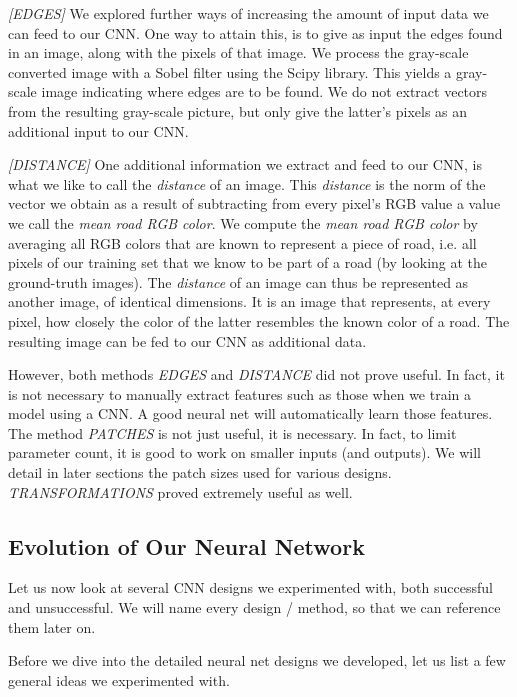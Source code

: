 \documentclass[10pt,conference,compsocconf]{IEEEtran}
\begin{document}
\textit{[EDGES]}   
We explored further ways of increasing the amount of input data we can feed to our CNN. One way to attain this, is to give as input the edges found in an image, along with the pixels of that image. We process the gray-scale converted image with a Sobel filter using the Scipy library. This yields a gray-scale image indicating where edges are to be found. We do not extract vectors from the resulting gray-scale picture, but only give the latter's pixels as an additional input to our CNN.

\textit{[DISTANCE]}   
One additional information we extract and feed to our CNN, is what we like to call the \textit{distance} of an image. This  \textit{distance} is the norm of the vector we obtain as a result of subtracting from every pixel's RGB value a value we call the \textit{mean road RGB color}. We compute the \textit{mean road RGB color} by averaging all RGB colors that are known to represent a piece of road, i.e. all pixels of our training set that we know to be part of a road (by looking at the ground-truth images). The \textit{distance} of an image can thus be represented as another image, of identical dimensions. It is an image that represents, at every pixel, how closely the color of the latter resembles the known color of a road. The resulting image can be fed to our CNN as additional data.

However, both methods \textit{EDGES} and \textit{DISTANCE} did not prove useful. In fact, it is not necessary to manually extract features such as those when we train a model using a CNN. A good neural net will automatically learn those features. The method \textit{PATCHES} is not just useful, it is necessary. In fact, to limit parameter count, it is good to work on smaller inputs (and outputs). We will detail in later sections the patch sizes used for various designs. \textit{TRANSFORMATIONS} proved extremely useful as well.



\subsection{Evolution of Our Neural Network} 
\label{ssec:technique}

Let us now look at several CNN designs we experimented with, both successful and unsuccessful. We will name every design / method, so that we can reference them later on.

Before we dive into the detailed neural net designs we developed, let us list a few general ideas we experimented with.
\end{document}
